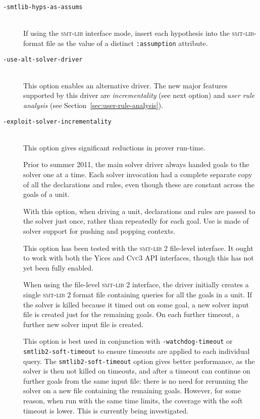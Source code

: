 \documentclass[12pt,fleqn]{article}
\newcommand{\cvcthree}{\textsc{Cvc}3}
\newcommand{\yices}{Yices}
\newcommand{\smtlib}{\textsc{smt-lib}}
\newcommand{\optionb}[1]{\item[\texttt{-{#1}}]\ \\}
\newcommand{\optionv}[2]{\item[\texttt{-{#1}=}\mdseries\textit{#2}]\ \\}
\begin{document}
\begin{description}
\optionb{smtlib-hyps-as-assums}
  If using the \smtlib{} interface mode, insert each hypothesis into
  the \smtlib{}-format file as the value of a distinct 
  \texttt{:assumption} attribute.
  
\optionb{use-alt-solver-driver}
  This option enables an alternative driver.  The new
  major features supported by this driver are \emph{incrementality} (see
  next option) and \emph{user rule analysis} (see
  Section~\ref{sec:user-rule-analysis}).
  
\optionb{exploit-solver-incrementality}
  This option gives significant reductions in prover run-time.

  Prior to summer 2011, the main solver driver always handed goals
  to the solver one at a time.  Each solver invocation had a complete
  separate copy of all the declarations and rules, even though these
  are constant across the goals of a unit. 

  With this option, when driving a unit, declarations and rules are
  passed to the solver just once, rather than repeatedly for each
  goal.  Use is made of solver support for pushing and popping
  contexts.

  This option has been tested with the \smtlib{} 2 file-level
  interface.  It ought to work with both the \yices{} and \cvcthree{}
  API interfaces, though this has not yet been fully enabled.

  When using the file-level \smtlib{} 2 interface, the driver
  initially creates a single \smtlib{} 2 format file containing
  queries for all the goals in a unit.  If the solver is killed
  because it timed out on some goal, a new solver input file is
  created just for the remaining goals. On each further timeout, a
  further new solver input file is created.

  This option is best used in conjunction with
  \texttt{-watchdog-timeout} or \texttt{smtlib2-soft-timeout} to
  ensure timeouts are applied to each individual query.  The
  \texttt{smtlib2-soft-timeout} option gives better performance, as
  the solver is then not killed on timeouts, and after a timeout can
  continue on further goals from the same input file: there is no need
  for rerunning the solver on a new file containing the remaining
  goals. However, for some reason, when run with the same time limits,
  the coverage with the soft timeout is lower.  This is currently being
  investigated.
  




\end{description}
\end{document}
